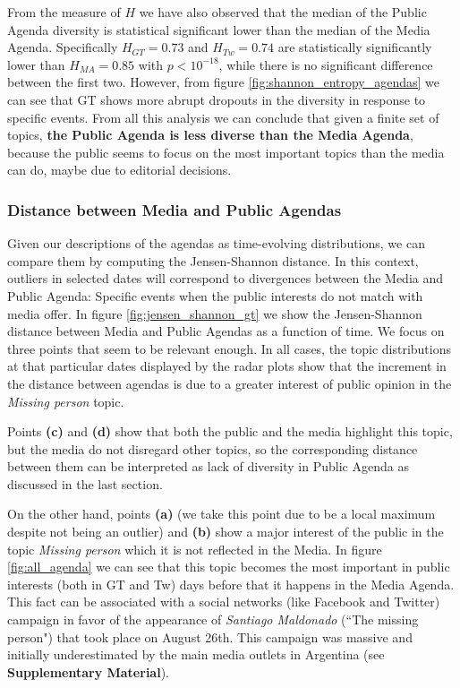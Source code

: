 \documentclass{bmcart}
\begin{document}
\par From the measure of $H$ we have also observed that the median of the Public Agenda diversity is statistical significant lower than the median of the Media Agenda.
Specifically $H_{GT} = 0.73$ and $H_{Tw} = 0.74$ are statistically significantly lower than $H_{MA} = 0.85$ with $p < 10^{-18}$, while there is no significant difference between the first two. 
However, from figure \ref{fig:shannon_entropy_agendas} we can see that GT shows more abrupt dropouts in the diversity in response to specific events.
From all this analysis we  can conclude that given a finite set of topics, \textbf{the Public Agenda is less diverse than the Media Agenda}, because the public seems to focus on the most important topics than the media can do, maybe due to editorial decisions.

\subsubsection*{Distance between Media and Public Agendas}

\par Given our descriptions of the agendas as time-evolving distributions, we can  compare them by computing the Jensen-Shannon distance. In this context, outliers in selected dates will correspond to divergences between the Media and Public Agenda: Specific events when the public interests do not match with media offer.
In figure \ref{fig:jensen_shannon_gt} we show the Jensen-Shannon distance between Media and Public Agendas as a function of time. We focus on three points that seem to be relevant enough. In all cases, the topic distributions at that particular dates displayed by  the radar plots show that the increment in the distance between agendas is due to a greater interest of public opinion in the \emph{Missing person} topic. 

\par Points \textbf{(c)} and \textbf{(d)} show that both the public and the media highlight this topic, but the media do not disregard other topics, so the corresponding distance between them can be interpreted as lack of diversity in Public Agenda as discussed in the last section.

\par On the other hand,  points \textbf{(a)} (we take this point due to be a local maximum despite not being an outlier) and \textbf{(b)}  show a major  interest of the public in the topic \emph{Missing person} which it is not reflected in the Media.  
In figure \ref{fig:all_agenda} we can see that this topic becomes the most important in public interests (both in GT and Tw) days before that it happens in the Media Agenda. This fact can be associated  with a social networks (like Facebook and Twitter) campaign  in favor  of the appearance of \emph{Santiago Maldonado} (``The missing person") that took place on  August 26th. This campaign was massive and  initially underestimated by the main media outlets in Argentina (see \textbf{Supplementary Material}). 
\end{document}

